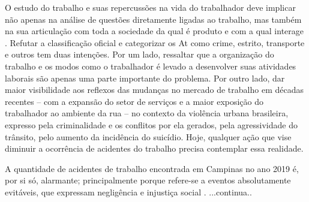 O estudo do trabalho e suas repercussões na vida do trabalhador deve implicar não apenas na análise de questões diretamente ligadas ao trabalho, mas também na sua articulação com toda a sociedade da qual é produto e com a qual interage \citep{mendes2003verso}. Refutar a classificação oficial e categorizar os At como crime, estrito, transporte e outros tem duas intenções. Por um lado, ressaltar que a organização do trabalho e os modos como o trabalhador é levado a desenvolver suas atividades laborais são apenas uma parte importante do problema. Por outro lado, dar maior visibilidade aos reflexos das mudanças no mercado de trabalho em décadas recentes – com a expansão do setor de serviços e a maior exposição do trabalhador ao ambiente da rua – no contexto da violência urbana brasileira, expresso pela criminalidade e os conflitos por ela gerados, pela agressividade do trânsito, pelo aumento da incidência do suicídio. Hoje, qualquer ação que vise diminuir a ocorrência de acidentes do trabalho precisa contemplar essa realidade.

A quantidade de acidentes de trabalho encontrada em Campinas no ano 2019 é, por si só, alarmante; principalmente porque refere-se a eventos absolutamente evitáveis, que expressam negligência e injustiça social \citep{santana2006acidentes}.
...continua..